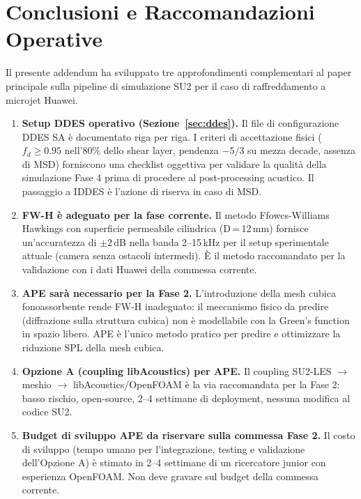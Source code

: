 \documentclass[11pt,a4paper]{article}
\begin{document}
\section{Conclusioni e Raccomandazioni Operative}
\label{sec:conclusioni}

Il presente addendum ha sviluppato tre approfondimenti complementari al paper
principale sulla pipeline di simulazione SU2 per il caso di raffreddamento
a microjet Huawei.

\begin{enumerate}

  \item \textbf{Setup DDES operativo (Sezione~\ref{sec:ddes}).}
        Il file di configurazione DDES SA è documentato riga per riga.
        I criteri di accettazione fisici ($f_d \geq 0.95$ nell'80\% dello
        shear layer, pendenza $-5/3$ su mezza decade, assenza di MSD)
        forniscono una checklist oggettiva per validare la qualità della
        simulazione Fase 4 prima di procedere al post-processing acustico.
        Il passaggio a IDDES è l'azione di riserva in caso di MSD.

  \item \textbf{FW-H è adeguato per la fase corrente.}
        Il metodo Ffowcs-Williams Hawkings con superficie permeabile
        cilindrica (D\,=\,12\,mm) fornisce un'accuratezza di $\pm 2$\,dB
        nella banda 2–15\,kHz per il setup sperimentale attuale (camera
        senza ostacoli intermedi).
        È il metodo raccomandato per la validazione con i dati Huawei
        della commessa corrente.

  \item \textbf{APE sarà necessario per la Fase 2.}
        L'introduzione della mesh cubica fonoassorbente rende FW-H
        inadeguato: il meccanismo fisico da predire (diffrazione sulla
        struttura cubica) non è modellabile con la Green's function in
        spazio libero.
        APE è l'unico metodo pratico per predire e ottimizzare la riduzione
        SPL della mesh cubica.

  \item \textbf{Opzione A (coupling libAcoustics) per APE.}
        Il coupling SU2-LES $\to$ meshio $\to$ libAcoustics/OpenFOAM è la
        via raccomandata per la Fase 2: basso rischio, open-source, 2–4
        settimane di deployment, nessuna modifica al codice SU2.

  \item \textbf{Budget di sviluppo APE da riservare sulla commessa Fase 2.}
        Il costo di sviluppo (tempo umano per l'integrazione, testing e
        validazione dell'Opzione A) è stimato in 2–4 settimane di un
        ricercatore junior con esperienza OpenFOAM. Non deve gravare
        sul budget della commessa corrente.

\end{enumerate}
\end{document}
